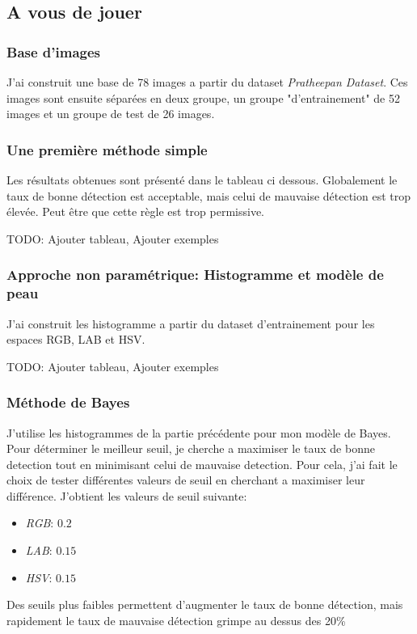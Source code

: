 \documentclass{article}
\begin{document}
\subsection{A vous de jouer}
\subsubsection{Base d'images}
J'ai construit une base de 78 images a partir du dataset \emph{Pratheepan Dataset}. Ces images sont ensuite séparées en deux groupe, un groupe "d'entrainement" de 52 images et un groupe de test de 26 images.

\subsubsection{Une première méthode simple}
Les résultats obtenues sont présenté dans le tableau ci dessous. Globalement le taux de bonne détection est acceptable, mais celui de mauvaise détection est trop élevée. Peut être que cette règle est trop permissive.

TODO: Ajouter tableau, Ajouter exemples

\subsubsection{Approche non paramétrique: Histogramme et modèle de peau}
J'ai construit les histogramme a partir du dataset d'entrainement pour les espaces RGB, LAB et HSV. 

TODO: Ajouter tableau, Ajouter exemples

\subsubsection{Méthode de Bayes}
J'utilise les histogrammes de la partie précédente pour mon modèle de Bayes. Pour déterminer le meilleur seuil, je cherche a maximiser le taux de bonne detection tout en minimisant celui de mauvaise detection. Pour cela, j'ai fait le choix de tester différentes valeurs de seuil en cherchant a maximiser leur différence. J'obtient les valeurs de seuil suivante:
\begin{itemize}
    \item \textit{RGB}: $0.2$
    \item \textit{LAB}: $0.15$
    \item \textit{HSV}: $0.15$
\end{itemize}
Des seuils plus faibles permettent d'augmenter le taux de bonne détection, mais rapidement le taux de mauvaise détection grimpe au dessus des 20\%
\end{document}
